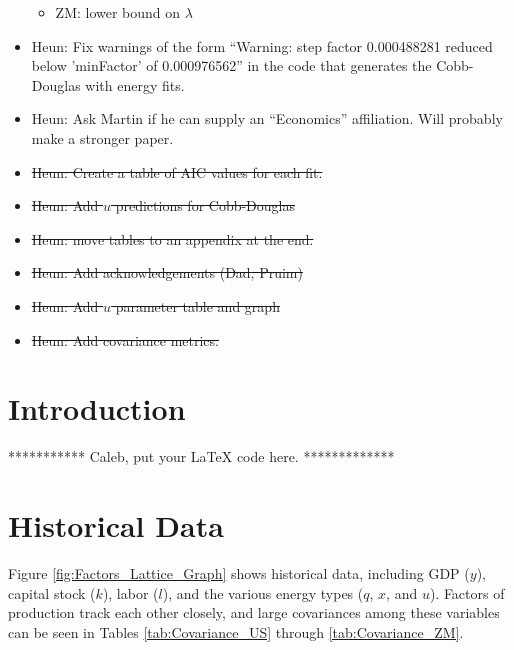 \documentclass[preprint,authoryear,12pt]{elsarticle}\usepackage{graphicx, color}
\begin{document}
\begin{itemize}
\begin{itemize}
      \item ZM: lower bound on $\lambda$
      \end{itemize}
\item Heun: Fix warnings of the form ``Warning:  step factor 0.000488281 reduced below ’minFactor’ of 0.000976562'' in the code that generates the Cobb-Douglas with energy fits.
\item Heun: Ask Martin if he can supply an ``Economics'' affiliation. Will probably make a stronger paper.
\item \st{Heun: Create a table of AIC values for each fit.}
\item \st{Heun: Add $u$ predictions for Cobb-Douglas}
\item \st{Heun: move tables to an appendix at the end.}
\item \st{Heun: Add acknowledgements (Dad, Pruim)}
\item \st{Heun: Add $u$ parameter table and graph}
\item \st{Heun: Add covariance metrics.}
\end{itemize}

\section{Introduction}

*********** Caleb, put your LaTeX code here. *************









\section{Historical Data}

Figure \ref{fig:Factors_Lattice_Graph} shows historical data, including GDP ($y$), capital stock ($k$), labor ($l$), and the various energy types ($q$, $x$, and $u$). Factors of production track each other closely, and large covariances among these variables can be seen in Tables \ref{tab:Covariance_US} through \ref{tab:Covariance_ZM}.
\end{document}
